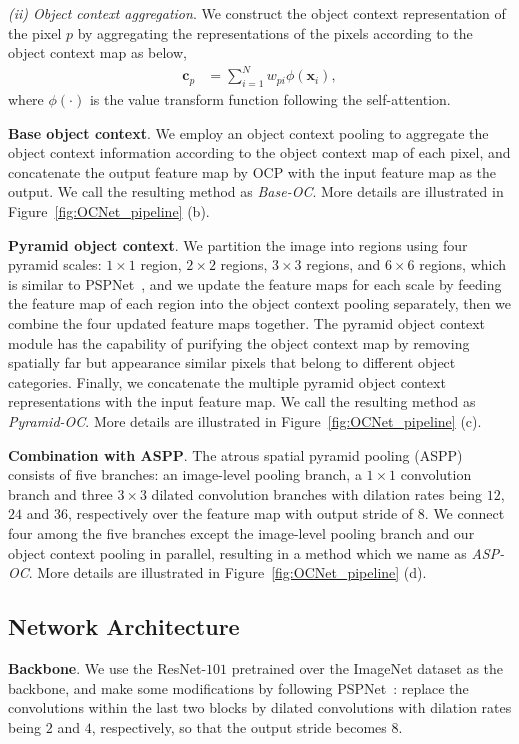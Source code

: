 \documentclass[10pt,twocolumn,letterpaper]{article}
\begin{document}
\emph{(ii) Object context aggregation}.
We construct the object context representation of the pixel $p$ by
aggregating the representations of the pixels according to the object context map as below,
\begin{align}
\mathbf{c}_p &= \sum_{i=1}^N w_{pi} \phi(\mathbf{x}_i),
\end{align}
where $\phi(\cdot)$ is the value transform function following the self-attention.

\vspace{.1cm}
\noindent\textbf{Base object context}.
We employ an object context pooling to aggregate the object context information according to the
object context map of each pixel,
and concatenate the output feature map by OCP with the input feature map as the output.
We call the resulting method as \emph{Base-OC}. More details are illustrated in Figure~\ref{fig:OCNet_pipeline} (b).

\vspace{.1cm}
\noindent\textbf{Pyramid object context}.
We partition the image into regions
using four pyramid scales:
$1\times 1$ region,
$2\times 2$ regions,
$3\times 3$ regions,
and $6 \times 6$ regions,
which is similar to PSPNet~\cite{zhao2017pyramid},
and we update the feature maps for each scale
by feeding the feature map of each region
into the object context pooling separately,
then we combine the four updated feature maps together.
The pyramid object context module has
the capability of purifying the object context map
by removing spatially far but appearance similar pixels that
belong to different object categories.
Finally, we concatenate the multiple pyramid object context representations
with the input feature map.
We call the resulting method as \emph{Pyramid-OC}.
More details are illustrated in Figure~\ref{fig:OCNet_pipeline} (c).

\vspace{.1cm}
\noindent\textbf{Combination with ASPP}.
The atrous spatial pyramid pooling (ASPP)
consists of five branches:
an image-level pooling branch,
a $1 \times 1$ convolution branch
and three $3 \times 3$ dilated convolution branches
with dilation rates being $12$, $24$ and $36$, respectively over
the feature map with output stride of $8$.
We connect four among the five branches except the image-level pooling branch
and our object context pooling in parallel,
resulting in a method which we name as \emph{ASP-OC}.
More details are illustrated in Figure~\ref{fig:OCNet_pipeline} (d).

\subsection{Network Architecture}
\noindent\textbf{Backbone}.
We use the ResNet-$101$ pretrained over the ImageNet dataset
as the backbone,
and make some modifications by following PSPNet~\cite{zhao2017pyramid}:
replace the convolutions within the last two blocks
by dilated convolutions with dilation rates being $2$ and $4$, respectively,
so that the output stride becomes $8$.
\end{document}
